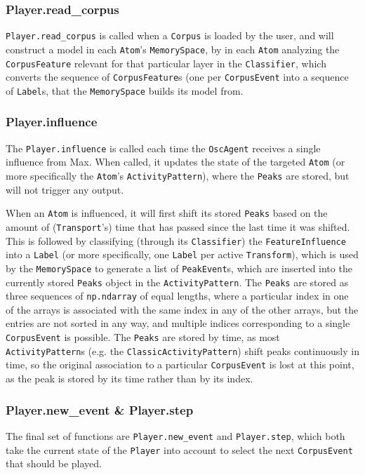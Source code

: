 \subsubsection{Player.read\_corpus}

\texttt{Player.read\_corpus} is called when a \texttt{Corpus} is loaded by the user, and will construct a model in each \texttt{Atom}'s \texttt{MemorySpace}, by in each \texttt{Atom} analyzing the \texttt{CorpusFeature} relevant for that particular layer in the \texttt{Classifier}, which converts the sequence of \texttt{CorpusFeature}s (one per \texttt{CorpusEvent} into a sequence of \texttt{Label}s, that the \texttt{MemorySpace} builds its model from.

\subsubsection{Player.influence}
The \texttt{Player.influence} is called each time the \texttt{OscAgent} receives a single influence from Max. When called, it updates the state of the targeted \texttt{Atom} (or more specifically the \texttt{Atom}'s \texttt{ActivityPattern}), where the \texttt{Peaks} are stored, but will not trigger any output.

When an \texttt{Atom} is influenced, it will first shift its stored \texttt{Peaks} based on the amount of (\texttt{Transport}'s) time that has passed since the last time it was shifted. This is followed by classifying (through its \texttt{Classifier}) the \texttt{FeatureInfluence} into a \texttt{Label} (or more specifically, one \texttt{Label} per active \texttt{Transform}), which is used by the \texttt{MemorySpace} to generate a list of \texttt{PeakEvent}s, which are inserted into the currently stored \texttt{Peaks} object in the \texttt{ActivityPattern}. The \texttt{Peaks} are stored as three sequences of \texttt{np.ndarray} of equal lengths, where a particular index in one of the arrays is associated with the same index in any of the other arrays, but the entries are not sorted in any way, and multiple indices corresponding to a single \texttt{CorpusEvent} is possible. The \texttt{Peaks} are stored by time, as most \texttt{ActivityPattern}s (e.g. the \texttt{ClassicActivityPattern}) shift peaks continuously in time, so the original association to a particular \texttt{CorpusEvent} is lost at this point, as the peak is stored by its time rather than by its index.

\subsubsection{Player.new\_event \& Player.step}
The final set of functions are \texttt{Player.new\_event} and \texttt{Player.step}, which both take the current state of the \texttt{Player} into account to select the next \texttt{CorpusEvent} that should be played. 

